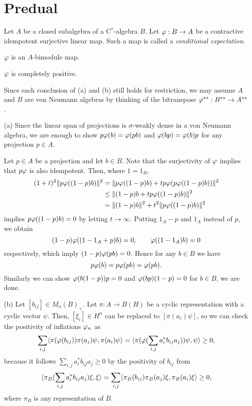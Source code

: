 \documentclass{../../large}
\begin{document}
\section{Predual}



\begin{prb}
Let $A$ be a closed subalgebra of a C$^*$-algebra $B$.
Let $\varphi:B\to A$ be a contractive idempotent surjective linear map.
Such a map is called a \emph{conditional expectation}.
\begin{parts}
\item $\varphi$ is an $A$-bimodule map.
\item $\varphi$ is completely positive.
\end{parts}
\end{prb}

\begin{pf}
Since each conclusion of (a) and (b) still holds for restriction, we may assume $A$ and $B$ are von Neumann algebras by thinking of the bitranspose $\varphi^{**}:B^{**}\to A^{**}$.

(a)
Since the linear span of projections is $\sigma$-weakly dense in a von Neumann algebra, we are enough to show $p\varphi(b)=\varphi(pb)$ and $\varphi(bp)=\varphi(b)p$ for any projection $p\in A$.

Let $p\in A$ be a projection and let $b\in B$.
Note that the surjectivity of $\varphi$ implies that $p\varphi$ is also idempotent.
Then, where $1=1_B$,
\begin{align*}
(1+t)^2\|p\varphi((1-p)b)\|^2
&=\|p\varphi((1-p)b)+tp\varphi(p\varphi((1-p)b))\|^2\\
&\le\|(1-p)b+tp\varphi((1-p)b)\|^2\\
&=\|(1-p)b\|^2+t^2\|p\varphi((1-p)b)\|^2
\end{align*}
implies $p\varphi((1-p)b)=0$ by letting $t\to\infty$.
Putting $1_A-p$ and $1_A$ instead of $p$, we obtain
\[(1-p)\varphi((1-1_A+p)b)=0,\qquad\varphi((1-1_A)b)=0\]
respectively, which imply $(1-p)\varphi(pb)=0$.
Hence for any $b\in B$ we have
\[p\varphi(b)=p\varphi(pb)=\varphi(pb).\]
Similarly we can show $\varphi(b(1-p))p=0$ and $\varphi(bp)(1-p)=0$ for $b\in B$, we are done.

(b)
Let $[b_{ij}]\in M_n(B)_+$.
Let $\pi:A\to B(H)$ be a cyclic representation with a cyclic vector $\psi$.
Then, $[\xi_i]\in H^n$ can be replaced to $[\pi(a_i)\psi]$, so we can check the positivity of inflations $\varphi_n$ as
\[\sum_{i,j}\langle\pi(\varphi(b_{ij}))\pi(a_j)\psi,\pi(a_i)\psi\rangle=\langle\pi(\varphi(\sum_{i,j}a_i^*b_{ij}a_j))\psi,\psi\rangle\ge0,\]
because it follows $\sum_{i,j}a_i^*b_{ij}a_j\ge0$ by the positivity of $b_{ij}$ from
\[\langle\pi_B(\sum_{i,j}a_i^*b_{ij}a_j)\xi,\xi\rangle=\sum_{i,j}\langle\pi_B(b_{ij})\pi_B(a_j)\xi,\pi_B(a_i)\xi\rangle\ge0,\]
where $\pi_B$ is any representation of $B$.
\end{pf}
\end{document}
